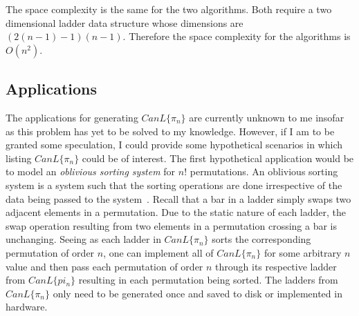    The space complexity is the same for the two algorithms. Both require a two dimensional ladder data structure whose dimensions 
    are $(2(n-1)-1)(n-1)$. Therefore the space complexity for the algorithms is $O(n^{2})$.

    \subsection{Applications}
    The applications for generating $CanL\{\pi_{n}\}$ are currently unknown to me insofar as this problem has yet to be solved to my knowledge. 
    However, if I am to be granted some speculation, I could provide some hypothetical scenarios in which listing $CanL\{\pi_{n}\}$ could 
    be of interest. The first hypothetical application would be to model an \emph{oblivious sorting system} for $n!$ permutations. An oblivious 
    sorting system is a system such that the sorting operations are done irrespective of the data being passed to the system~\cite{A7}. Recall 
    that a bar in a ladder simply swaps two adjacent elements in a permutation. Due to the static nature of each ladder, the swap operation 
    resulting from two elements in a permutation crossing a bar is unchanging. 
    Seeing as each ladder in $CanL\{\pi_{n}\}$ sorts the corresponding permutation of order $n$, one can implement all of $CanL\{\pi_{n}\}$ 
    for some arbitrary $n$ value and then pass each permutation of order $n$ through its respective ladder from $CanL\{pi_{n}\}$ 
    resulting in each permutation being sorted. The ladders from $CanL\{\pi_{n}\}$ only need to be generated once and saved to disk 
    or implemented in hardware. 